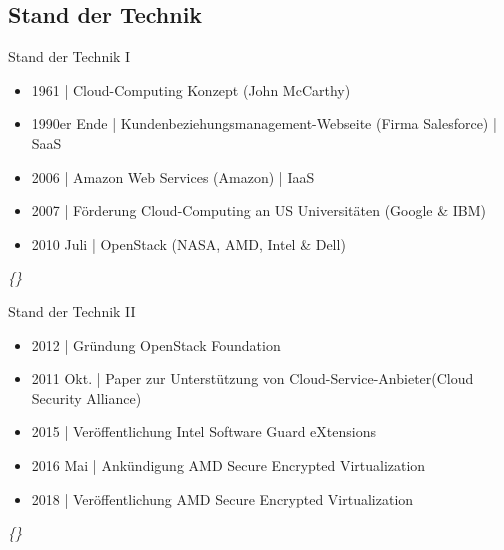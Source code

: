 \documentclass{sdqbeamer}
\begin{document}
\subsection{Stand der Technik}
\begin{frame}{Stand der Technik I}
	\begin{itemize}
		\item 1961 | Cloud-Computing Konzept (John McCarthy)
		\item 1990er Ende | Kundenbeziehungsmanagement-Webseite (Firma Salesforce) | SaaS
		\item 2006 | Amazon Web Services (Amazon) | IaaS
		\item 2007 | Förderung Cloud-Computing an US Universitäten (Google \& IBM)
		\item 2010 Juli | OpenStack (NASA, AMD, Intel \& Dell)
	\end{itemize}
	\vfill
	\textit{\{\cite{surbiryala, intel, amd}\}}
\end{frame}
\begin{frame}{Stand der Technik II}
	\begin{itemize}
		\item 2012 | Gründung OpenStack Foundation
		\item 2011 Okt. | Paper zur Unterstützung von Cloud-Service-Anbieter(Cloud Security Alliance)
		\item 2015 | Veröffentlichung Intel Software Guard eXtensions
		\item 2016 Mai | Ankündigung AMD Secure Encrypted Virtualization
		\item 2018 | Veröffentlichung AMD Secure Encrypted Virtualization
	\end{itemize}
	\vfill
	\textit{\{\cite{surbiryala, intel, amd}\}}
\end{frame}
\end{document}
